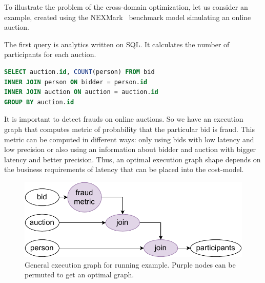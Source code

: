 To illustrate the problem of the cross-domain optimization, let us consider an example, created using the NEXMark~\cite{TODO} benchmark model simulating an online auction.

The first query is analytics written on SQL.
It calculates the number of participants for each auction.
\begin{lstlisting}[language=SQL]
SELECT auction.id, COUNT(person) FROM bid
INNER JOIN person ON bidder = person.id
INNER JOIN auction ON auction = auction.id
GROUP BY auction.id
\end{lstlisting}

It is important to detect frauds on online auctions.
So we have an execution graph that computes metric of  probability that the particular bid is fraud.
This metric can be computed in different ways:
only using bids with low latency and low precision
or
also using an information about bidder and auction with bigger latency and better precision.
Thus, an optimal execution graph shape depends on the business requirements of latency that can be placed into the cost-model.

\begin{figure}[h!]
    \includegraphics[width=\linewidth]{images/poster.pdf}
    \caption{General execution graph for running example. Purple nodes can be permuted to get an optimal graph.}
    \label{fig}
\end{figure}
